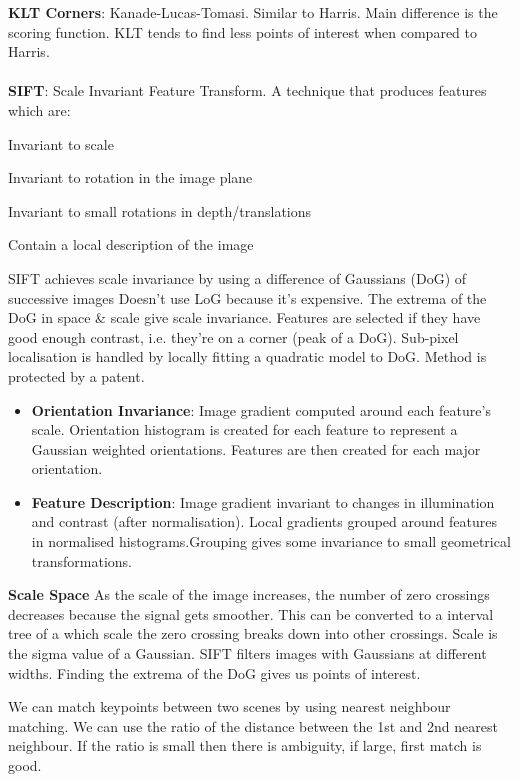 \documentclass[8pt]{extarticle}
\begin{document}
\begin{multicols}{2}
\textbf{KLT Corners}: Kanade-Lucas-Tomasi. Similar to Harris. Main difference is the scoring function. KLT tends to find less points of interest when compared to Harris.
\\ \\
\textbf{SIFT}: Scale Invariant Feature Transform. A technique that produces features which are:
\begin{compactitem}
    \item Invariant to scale
    \item Invariant to rotation in the image plane
    \item Invariant to small rotations in depth/translations
    \item Contain a local description of the image
\end{compactitem}

SIFT achieves scale invariance by using a difference of Gaussians (DoG) of successive images Doesn't use LoG because it's expensive. The extrema of the DoG in space \& scale give scale invariance. Features are selected if they have good enough contrast, i.e. they're on a corner (peak of a DoG). Sub-pixel localisation is handled by locally fitting a quadratic model to DoG. Method is protected by a patent.
\begin{itemize}
    \item \textbf{Orientation Invariance}: Image gradient computed around each feature's scale. Orientation histogram is created for each feature to represent a Gaussian weighted orientations. Features are then created for each major orientation.
    \item \textbf{Feature Description}: Image gradient invariant to changes in illumination and contrast (after normalisation). Local gradients grouped around features in normalised histograms.Grouping gives some invariance to small geometrical transformations.
\end{itemize}

\textbf{Scale Space} As the scale of the image increases, the number of zero crossings decreases because the signal gets smoother. This can be converted to a interval tree of a which scale the zero crossing breaks down into other crossings. Scale is the sigma value of a Gaussian. SIFT filters images with Gaussians at different widths. Finding the extrema of the DoG gives us points of interest.

We can match keypoints between two scenes by using nearest neighbour matching. We can use the ratio of the distance between the 1st and 2nd nearest neighbour. If the ratio is small then there is ambiguity, if large, first match is good.


\end{multicols}
\end{document}
